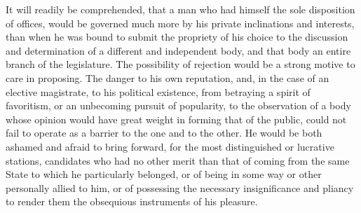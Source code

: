 It will readily be comprehended, that a man who had himself the sole disposition of offices, would be governed much more by his private inclinations and interests, than when he was bound to submit the propriety of his choice to the discussion and determination of a different and independent body, and that body an entire branch of the legislature. 
The possibility of rejection would be a strong motive to care in proposing. 
The danger to his own reputation, and, in the case of an elective magistrate, to his political existence, from betraying a spirit of favoritism, or an unbecoming pursuit of popularity, to the observation of a body whose opinion would have great weight in forming that of the public, could not fail to operate as a barrier to the one and to the other. 
He would be both ashamed and afraid to bring forward, for the most distinguished or lucrative stations, candidates who had no other merit than that of coming from the same State to which he particularly belonged, or of being in some way or other personally allied to him, or of possessing the necessary insignificance and pliancy to render them the obsequious instruments of his pleasure.

